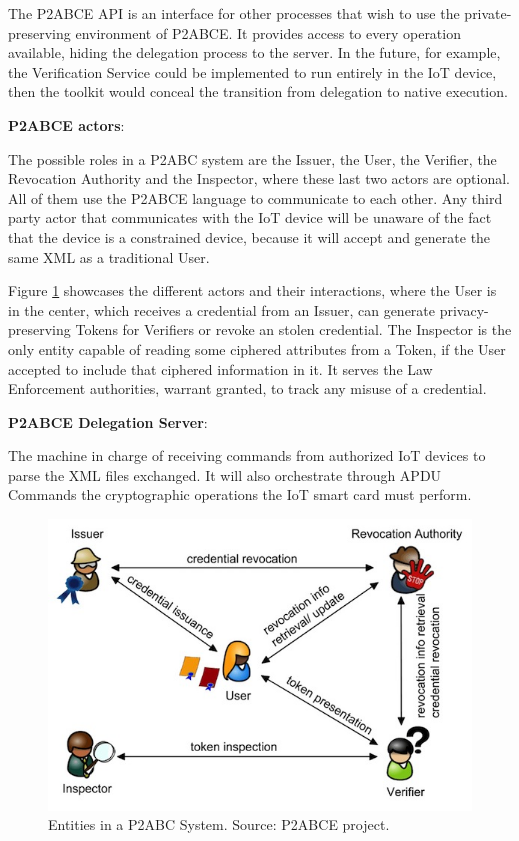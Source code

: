 	The P2ABCE API is an interface for other processes that wish to use the private-preserving environment of P2ABCE. It provides access to every operation available, hiding the delegation process to the server. In the future, for example, the Verification Service could be implemented to run entirely in the IoT device, then the toolkit would conceal the transition from delegation to native execution.
	
\hfil

\begin{flushleft}
	\textbf{P2ABCE actors}:
\end{flushleft}
	
	The possible roles in a P2ABC system are the Issuer, the User, the Verifier, the Revocation Authority and the Inspector, where these last two actors are optional. All of them use the P2ABCE language to communicate to each other. Any third party actor that communicates with the IoT device will be unaware of the fact that the device is a constrained device, because it will accept and generate the same XML as a traditional User.
	
	Figure \ref{fig:actors} showcases the different actors and their interactions, where the User is in the center, which receives a credential from an Issuer, can generate privacy-preserving Tokens for Verifiers or revoke an stolen credential. The Inspector is the only entity capable of reading some ciphered attributes from a Token, if the User accepted to include that ciphered information in it. It serves the Law Enforcement authorities, warrant granted, to track any misuse of a credential.
	
\hfil
	
\begin{flushleft}
	\textbf{P2ABCE Delegation Server}:
\end{flushleft}
	
	The machine in charge of receiving commands from authorized IoT devices to parse the XML files exchanged. It will also orchestrate through APDU Commands the cryptographic operations the IoT smart card must perform.
	

\begin{figure}[bth]
	\centering
	\includegraphics[width=0.8\linewidth]{gfx/actors.jpg}
	\caption{Entities in a P2ABC System. Source: P2ABCE project.}
	\label{fig:actors}
\end{figure}


